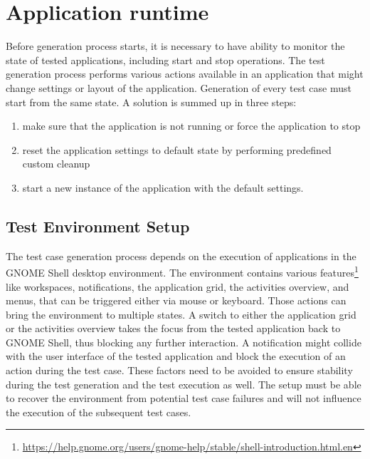 \section{Application runtime}
Before generation process starts, it is necessary to have ability to monitor the state of tested applications, including start and stop operations. The test generation process performs various actions available in an application that might change settings or layout of the application. Generation of every test case must start from the same state. A solution is summed up in three steps:
\begin{enumerate}
    \item make sure that the application is not running or force the application to stop
    \item reset the application settings to default state by performing predefined custom cleanup
    \item start a new instance of the application with the default settings.
\end{enumerate}

\subsection{Test Environment Setup}
The test case generation process depends on the execution of applications in the GNOME Shell desktop environment. The environment contains various features\footnote{\url{https://help.gnome.org/users/gnome-help/stable/shell-introduction.html.en}} like workspaces, notifications, the application grid, the activities overview, and menus, that can be triggered either via mouse or keyboard. Those actions can bring the environment to multiple states. A switch to either the application grid or the activities overview takes the focus from the tested application back to GNOME Shell, thus blocking any further interaction. A notification might collide with the user interface of the tested application and block the execution of an action during the test case. These factors need to be avoided to ensure stability during the test generation and the test execution as well. The setup must be able to recover the environment from potential test case failures and will not influence the execution of the subsequent test cases. 

